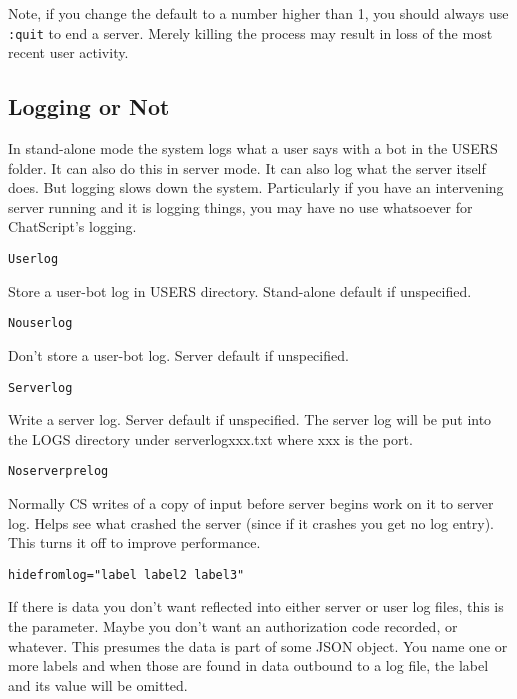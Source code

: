 \documentclass[]{article}
\begin{document}
Note, if you change the default to a number higher than 1, you should
always use \texttt{:quit} to end a server. Merely killing the process
may result in loss of the most recent user activity.

\subsection{Logging or Not}\label{logging-or-not}

In stand-alone mode the system logs what a user says with a bot in the
USERS folder. It can also do this in server mode. It can also log what
the server itself does. But logging slows down the system. Particularly
if you have an intervening server running and it is logging things, you
may have no use whatsoever for ChatScript's logging.

\begin{verbatim}
Userlog
\end{verbatim}

Store a user-bot log in USERS directory. Stand-alone default if
unspecified.

\begin{verbatim}
Nouserlog
\end{verbatim}

Don't store a user-bot log. Server default if unspecified.

\begin{verbatim}
Serverlog
\end{verbatim}

Write a server log. Server default if unspecified. The server log will
be put into the LOGS directory under serverlogxxx.txt where xxx is the
port.

\begin{verbatim}
Noserverprelog
\end{verbatim}

Normally CS writes of a copy of input before server begins work on it to
server log. Helps see what crashed the server (since if it crashes you
get no log entry). This turns it off to improve performance.

\begin{verbatim}
hidefromlog="label label2 label3"
\end{verbatim}

If there is data you don't want reflected into either server or user log
files, this is the parameter. Maybe you don't want an authorization code
recorded, or whatever. This presumes the data is part of some JSON
object. You name one or more labels and when those are found in data
outbound to a log file, the label and its value will be omitted.
\end{document}

